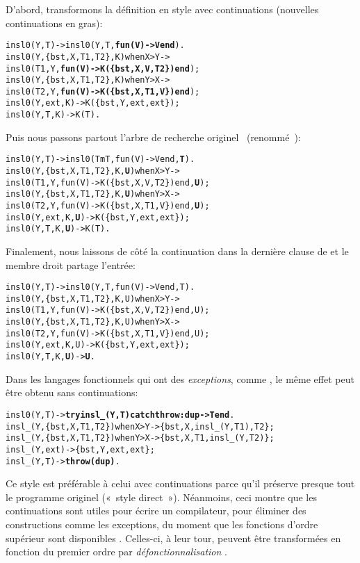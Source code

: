 D'abord, transformons la définition en style avec continuations
(nouvelles continuations en gras):
\begin{alltt}
insl0(Y,T)               -> insl0(Y,T,\textbf{fun(V) -> V end}).
insl0(Y,\{bst,X,T1,T2\},K) when X > Y ->
\hfill{}insl0(T1,Y,\textbf{fun(V) -> K(\{bst,X,V,T2\}) end});
insl0(Y,\{bst,X,T1,T2\},K) when Y > X ->
\hfill{}insl0(T2,Y,\textbf{fun(V) -> K(\{bst,X,T1,V\}) end});
insl0(Y,          ext,K) -> K(\{bst,Y,ext,ext\});
insl0(Y,            T,K) -> K(T).
\end{alltt}
Puis nous passons partout l'arbre de recherche originel~
(renommé~):
\begin{alltt}
insl0(Y,T)                 -> insl0(TmT,fun(V) -> V end,\textbf{T}).
insl0(Y,\{bst,X,T1,T2\},K,\textbf{U}) when X > Y ->
\hfill{}insl0(T1,Y,fun(V) -> K(\{bst,X,V,T2\}) end,\textbf{U});
insl0(Y,\{bst,X,T1,T2\},K,\textbf{U}) when Y > X ->
\hfill{}insl0(T2,Y,fun(V) -> K(\{bst,X,T1,V\}) end,\textbf{U});
insl0(Y,          ext,K,\textbf{U}) -> K(\{bst,Y,ext,ext\});
insl0(Y,            T,K,\textbf{U}) -> K(T).
\end{alltt}
Finalement, nous laissons de côté la continuation dans la dernière
clause de  et le membre droit partage l'entrée:
\begin{alltt}
insl0(Y,T)                 -> insl0(Y,T,fun(V) -> V end,T).
insl0(Y,\{bst,X,T1,T2\},K,U) when X > Y ->
\hfill{}insl0(T1,Y,fun(V) -> K(\{bst,X,V,T2\}) end,U);
insl0(Y,\{bst,X,T1,T2\},K,U) when Y > X ->
\hfill{}insl0(T2,Y,fun(V) -> K(\{bst,X,T1,V\}) end,U);
insl0(Y,          ext,K,U) -> K(\{bst,Y,ext,ext\});
insl0(Y,            T,K,\textbf{U}) -> \textbf{U}.\hfill% \emph{Entrée partagée}
\end{alltt}
Dans les langages fonctionnels qui ont des
\emph{exceptions},
comme \Erlang, le même effet peut être obtenu sans continuations:
\begin{alltt}
insl0(Y,T) -> \textbf{try insl\_(Y,T) catch throw:dup -> T end}.
insl\_(Y,\{bst,X,T1,T2\}) when X > Y -> \{bst,X,insl\_(Y,T1),T2\};
insl\_(Y,\{bst,X,T1,T2\}) when Y > X -> \{bst,X,T1,insl\_(Y,T2)\};
insl\_(Y,          ext)            -> \{bst,Y,ext,ext\};
insl\_(Y,            T)            -> \textbf{throw(dup)}.
\end{alltt}
Ce style est préférable à celui avec continuations parce qu'il
préserve presque tout le programme originel («~style
direct~»). Néanmoins, ceci montre que les continuations sont utiles
pour écrire un compilateur, pour éliminer des constructions comme les
exceptions, du moment que les fonctions d'ordre supérieur sont
disponibles \citep{Appel_1992}. Celles-ci, à leur tour, peuvent être
transformées en fonction du premier ordre par
\emph{défonctionnalisation}
\citep{Reynolds_1972,DanvyNielsen_2001}.

